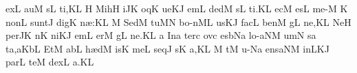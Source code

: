 \spatium
\sgn {}ex\punctum L\egn
\sgn {}au\punctum M\egn
{}s\punctum L\egn
\sgn ti,\punctum K\augmentum L\egn
\spatium
\divisiominor
\spatium
\custos H
\Internote
\lineaproxima
\sgn Mih\punctum H\egn
\sgn {}i{}\pes JK\egn
\spatium
{}oq\punctum K\egn
\sgn ue{}\clivis KJ\egn
\spatium
{}em\punctum L\egn
\spatium
\sgn ded\punctum M\egn
\sgn {}{\'\i}s\punctum L\egn
\sgn ti.\punctum K\augmentum L\egn
\spatium
\divisiofinalis
\spatium
{}ec\punctum M\egn
\sgn {}es\punctum L\egn
\spatium
\sgn me-\punctum M\egn
\sgn {}{\ae}{}\punctum K\egn
\spatium
\sgn non\punctum L\egn
\spatium
\sgn su{nt}\punctum J\egn
\spatium
\sgn dig\punctum K\egn
\sgn n{\ae}:\punctum K\augmentum L\egn
\spatium
\divisiominor
\spatium
\custos M
\lineaproxima
\sgn Sed\punctum M\egn
\spatium
\sgn tu{}\pes MN\egn
\spatium
\sgn bo{-n}\clivis ML\egn
\sgn {}us\clivis KJ\egn
\spatium
\sgn fac\punctum L\egn
\spatium
\sgn ben\punctum M\egn
\sgn {}{\'\i}g\punctum L\egn
\sgn ne,\punctum K\augmentum L\egn
\spatium
\divisiominor
\spatium
\sgn Ne{}\punctum H\egn
\spatium
\sgn per\pes JK\egn
{}n\punctum K\egn
\sgn ni{}\clivis KJ\egn
\spatium
{}em\punctum L\egn
\sgn {}er\punctum M\egn
\spatium
\sgn {}{\'\i}g\punctum L\egn
\sgn ne.\punctum K\augmentum L\egn
\spatium
\divisiofinalis
\spatium
\custos a
\Internote
\lineaproxima
\sgn {}In\punctum a\egn
\sgn ter\punctum c\egn
\spatium
\sgn {}ov\punctum c\egn
\sgn {}es\porrectus bNa\egn
\spatium
\sgn lo{-}\climacus aNM\egn
{}um\punctum N\egn
\spatium
{}s\punctum a\egn
\sgn ta,\clivis aK\augmentumduplex bL\egn
\spatium
\divisiominor
\spatium
\sgn {}Et\punctum M\egn
\spatium
\sgn {}ab\punctum L\egn
\spatium
\sgn h{\ae}d\punctum M\egn
\sgn {}is\punctum K\egn
\spatium
\sgn me{}\punctum L\egn
\spatium
\sgn seq\punctum J\egn
{}s\punctum K\egn
{}a,\punctum K\augmentum L\egn
\spatium
\divisiominor
\spatium
\custos M
\lineaproxima
{}t\punctum M\egn
\sgn {}u-\pes Na\egn
\sgn {}e{ns}\climacus aNM\egn
\spatium
\sgn {}in\climacus LKJ\egn
\spatium
\sgn par\punctum L\egn
\sgn te{}\punctum M\egn
\spatium
\sgn dex\punctum L\egn
{}a.\punctum K\augmentum L\egn
